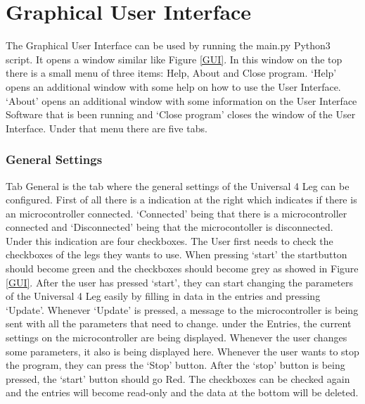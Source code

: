 \documentclass{article}
\begin{document}
\section{Graphical User Interface}

The Graphical User Interface can be used by running the main.py Python3 script.
It opens a window similar like Figure \ref{GUI}. In this window on the top there 
is a small menu of three items: Help, About and Close program. 
`Help' opens an additional window with some help on how to use the User Interface.
`About' opens an additional window with some information on the User Interface Software 
that is been running and `Close program' closes the window of the User Interface. 
Under that menu there are five tabs. 

\subsubsection{General Settings}
Tab General is the tab where the general settings of the Universal 4 Leg can be configured. 
First of all there is a indication at the right which indicates if there is an microcontroller connected. 
`Connected' being that there is a microcontroller connected and `Disconnected' being that the 
microcontoller is disconnected. Under this indication are four checkboxes. 
The User first needs to check the checkboxes of the legs they wants to use.
When pressing `start' the startbutton should become green and the checkboxes should become grey as showed in Figure \ref{GUI}. 
After the user has pressed `start', they can start changing the parameters of the Universal 4 Leg 
easily by filling in data in the entries and pressing `Update'. 
Whenever `Update' is pressed, a message to the microcontroller is being sent with all the parameters that need to change. 
under the Entries, the current settings on the microcontroller are being displayed. 
Whenever the user changes some parameters, it also is being displayed here. 
Whenever the user wants to stop the program, they can press the `Stop' button. 
After the `stop' button is being pressed, 
the `start' button should go Red. 
The checkboxes can be checked again and the entries will become read-only and the data at the bottom will be deleted.
\end{document}
